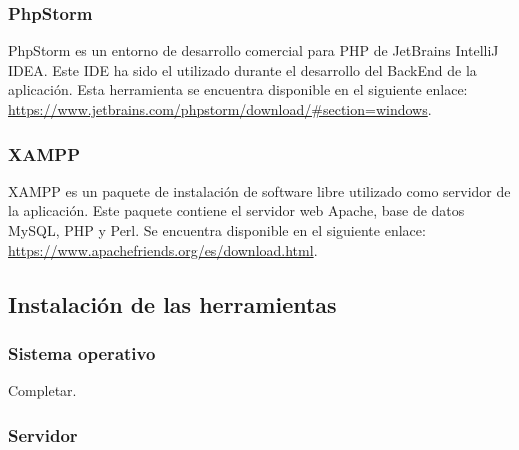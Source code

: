 \subsubsection{PhpStorm}

PhpStorm es un entorno de desarrollo comercial para PHP de JetBrains IntelliJ IDEA. Este IDE ha sido el utilizado durante el desarrollo del BackEnd de la aplicación. Esta herramienta se encuentra disponible en el siguiente enlace: \url{https://www.jetbrains.com/phpstorm/download/#section=windows}.
\subsubsection{XAMPP}

XAMPP es un paquete de instalación de software libre utilizado como servidor de la aplicación. Este paquete contiene el servidor web Apache, base de datos MySQL, PHP y Perl. Se encuentra disponible en el siguiente enlace: \url{https://www.apachefriends.org/es/download.html}.


\subsection{Instalación de las herramientas}

\subsubsection{Sistema operativo}

Completar.

\subsubsection{Servidor}

